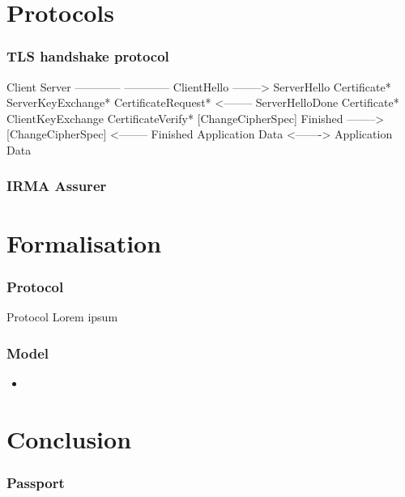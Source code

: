 \documentclass[hyperref={urlcolor=black, citecolor=black, pdfpagemode=UseNone, pdfpagelayout=SinglePage, pdfstartview=}]{beamer}
\begin{document}
\section{Protocols}
\begin{frame}[fragile]
  \frametitle{TLS handshake protocol}
\scriptsize
  \begin{semiverbatim}
{\large Client}                                     {\large Server}
------------                                   ------------
ClientHello              -------->
                                                ServerHello
                                               Certificate*
                                         ServerKeyExchange*                
                                        CertificateRequest*
                         <--------          ServerHelloDone
Certificate*
ClientKeyExchange
CertificateVerify*
[ChangeCipherSpec]
Finished                 -------->
                                         [ChangeCipherSpec]
                         <--------                 Finished
Application Data         <------->         Application Data
\end{semiverbatim}
\end{frame}

\begin{frame}
  \frametitle{IRMA Assurer}
\end{frame}

\section{Formalisation}
\begin{frame}
  \frametitle{Protocol}
  \begin{block}{Protocol}
    Lorem ipsum
  \end{block}
\end{frame}

\begin{frame}
  \frametitle{Model}
  \begin{example}
    \begin{itemize}
      \item 
    \end{itemize}
  \end{example}
\end{frame}

\section{Conclusion}
\begin{frame}
  \frametitle{Passport}
\end{frame}
\end{document}
